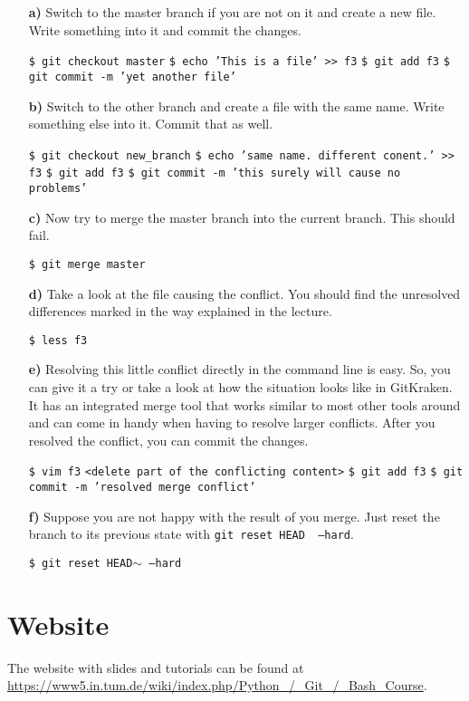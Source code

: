 \documentclass[11pt]{article}
\begin{document}
\begin{itemize}
\item[\bf{a)}] Switch to the master branch if you are not on it and create a new file. Write something into it and commit the changes.
\begin{framed}
\texttt{\$ git checkout master} \newline
\texttt{\$ echo 'This is a file' >> f3} \newline
\texttt{\$ git add f3} \newline
\texttt{\$ git commit -m 'yet another file'}
\end{framed}
\item[\bf{b)}]  Switch to the other branch and create a file with the same name. Write something else into it. Commit that as well.
\begin{framed}
\texttt{\$ git checkout new\_branch} \newline
\texttt{\$ echo 'same name. different conent.' >> f3} \newline
\texttt{\$ git add f3} \newline
\texttt{\$ git commit -m 'this surely will cause no problems'}
\end{framed}
\item[\bf{c)}] Now try to merge the master branch into the current branch. This should fail.
\begin{framed}
\texttt{\$ git merge master}
\end{framed}
\item[\bf{d)}] Take a look at the file causing the conflict. You should find the unresolved differences marked in the way explained in the lecture.
\begin{framed}
\texttt{\$ less f3}
\end{framed}
\item[\bf{e)}] Resolving this little conflict directly in the command line is easy. So, you can give it a try or take a look at how the situation looks like in GitKraken. It has an integrated merge tool that works similar to most other tools around and can come in handy when having to resolve larger conflicts. After you resolved the conflict, you can commit the changes.
\begin{framed}
\texttt{\$ vim f3} \newline
\texttt{<delete part of the conflicting content>} \newline
\texttt{\$ git add f3} \newline
\texttt{\$ git commit -m 'resolved merge conflict'}
\end{framed}
\item[\bf{f)}] Suppose you are not happy with the result of you merge. Just reset the branch to its previous state with \texttt{git reset HEAD~ --hard}.
\begin{framed}
\texttt{\$ git reset HEAD$\sim$ --hard}
\end{framed}
\end{itemize}

\section*{Website}
The website with slides and tutorials can be found at\\
\url{https://www5.in.tum.de/wiki/index.php/Python_/_Git_/_Bash_Course}.
\end{document}
